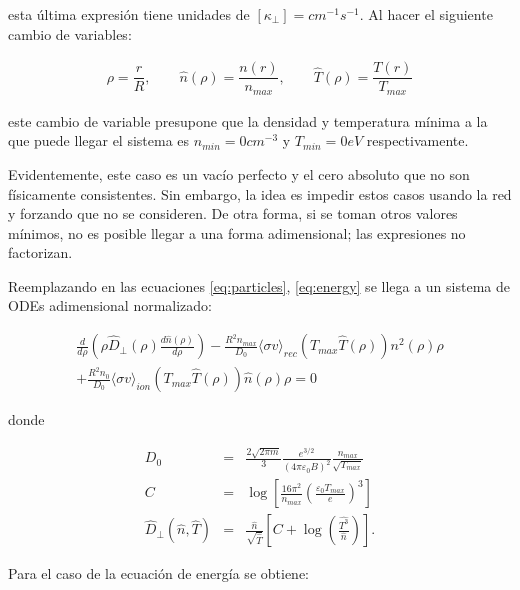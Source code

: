 esta última expresión tiene unidades de  $[\kappa_\perp] = cm^{-1} s^{-1}$. Al hacer el siguiente cambio de variables:

\begin{eqnarray}
	\rho = \dfrac{r}{R}, \quad \quad \hat{n}(\rho) = \dfrac{n(r)}{n_{max}} , \quad \quad \hat{T}(\rho) = \dfrac{T(r)}{T_{max}}	
\end{eqnarray}

este cambio de variable presupone que la densidad y temperatura mínima a la que puede llegar el sistema es $n_{min} = 0 cm^{-3}$ y $T_{min} = 0 eV$  respectivamente. 

Evidentemente, este caso es un vacío perfecto y el cero absoluto que no son físicamente consistentes. Sin embargo, la idea es impedir estos casos usando la red y forzando que no se consideren. De otra forma, si se toman otros valores mínimos, no es posible llegar a una forma adimensional; las expresiones no factorizan. 

Reemplazando en las ecuaciones \eqref{eq:particles}, \eqref{eq:energy} se llega a un sistema de ODEs adimensional normalizado:

\begin{eqnarray}\label{eq:particlesn}
	\frac{d}{d\rho}\left(\rho\hat{D}_\perp(\rho) \frac{d\hat{n}(\rho)}{d\rho}\right) - \frac{R^2 n_{max}}{D_0}\langle\sigma v\rangle_{rec}( T_{max}\hat{T}(\rho) )n^2(\rho)\rho \nonumber\\
	+ \frac{R^2 n_0}{D_0}\langle\sigma v\rangle_{ion}(T_{max}\hat{T}(\rho))\hat{n}(\rho) \rho=0\quad
\end{eqnarray}

donde 

\begin{eqnarray}
	D_0 &=& \frac{2 \sqrt{2 \pi m}}{3}\frac{e^{3/2}}{(4\pi \varepsilon_0 B)^2}\frac{n_{max}}{\sqrt{T_{max}}} \\
	C &=&  \log{\left[\frac{16\pi^2}{n_{max}}\left(\frac{\varepsilon_0 T_{max}}{e}\right)^3\right]} \\
	\hat{D}_\perp(\hat{n},\hat{T}) &=& \frac{\hat{n}}{\sqrt{\hat{T}}} \left[ C + \log{\left(\frac{\hat{T^3}}{\hat{n}}\right)} \right].
\end{eqnarray}

Para el caso de la ecuación de energía se obtiene:

